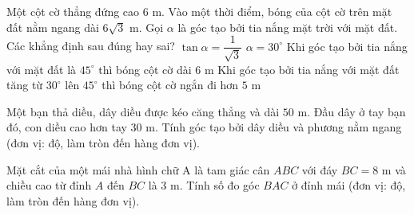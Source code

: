 \begin{ex}%
	Một cột cờ thẳng đứng cao $6\text{ m}$. Vào một thời điểm, bóng của cột cờ trên mặt đất nằm ngang dài $6\sqrt3\text{ m}$. Gọi $\alpha$ là góc tạo bởi tia nắng mặt trời với mặt đất. Các khẳng định sau đúng hay sai?
	\choiceTF
	{\True $\tan\alpha=\dfrac{1}{\sqrt3}$}
	{\True $\alpha=30^\circ$}
	{\True Khi góc tạo bởi tia nắng với mặt đất là $45^\circ$ thì bóng cột cờ dài $6\text{ m}$}
	{Khi góc tạo bởi tia nắng với mặt đất tăng từ $30^\circ$ lên $45^\circ$ thì bóng cột cờ ngắn đi hơn $5\text{ m}$}
\end{ex}

\begin{bt}%
	Một bạn thả diều, dây diều được kéo căng thẳng và dài $50\text{ m}$. Đầu dây ở tay bạn đó, con diều cao hơn tay $30\text{ m}$. Tính góc tạo bởi dây diều và phương nằm ngang (đơn vị: độ, làm tròn đến hàng đơn vị).
\end{bt}

\begin{bt}%
	Mặt cắt của một mái nhà hình chữ A là tam giác cân $ABC$ với đáy $BC=8\text{ m}$ và chiều cao từ đỉnh $A$ đến $BC$ là $3\text{ m}$. Tính số đo góc $BAC$ ở đỉnh mái (đơn vị: độ, làm tròn đến hàng đơn vị).
\end{bt}
